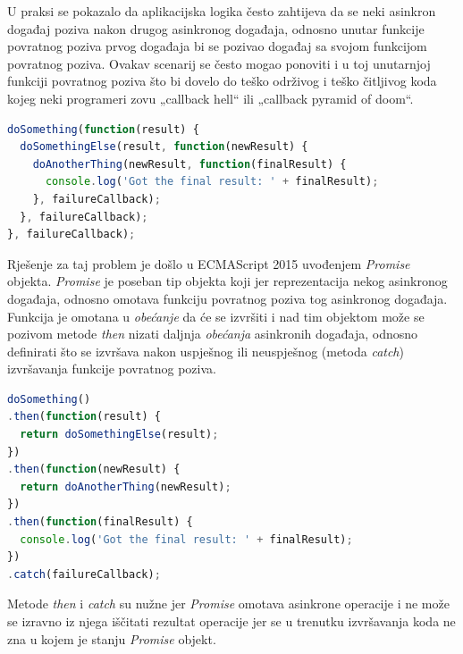 \documentclass[times, utf8, diplomski, numeric]{fer}
\newcommand{\razmakp}{\vspace{18pt}}
\newcommand{\razmaks}{\vspace{10pt}}
\begin{document}
\razmakp

U praksi se pokazalo da aplikacijska logika često zahtijeva da se neki asinkron događaj poziva nakon drugog asinkronog događaja, odnosno unutar funkcije povratnog poziva prvog događaja bi se pozivao događaj sa svojom funkcijom povratnog poziva.
Ovakav scenarij se često mogao ponoviti i u toj unutarnjoj funkciji povratnog poziva što bi dovelo do teško održivog i teško čitljivog koda kojeg neki programeri zovu „callback hell“ ili „callback pyramid of doom“.

\razmakp %
\begin{lstlisting}[language=JavaScript, caption={Primjer ugnježđivanja funkcija povratnog poziva}, label={lst:callback}]
doSomething(function(result) {
  doSomethingElse(result, function(newResult) {
    doAnotherThing(newResult, function(finalResult) {
      console.log('Got the final result: ' + finalResult);
    }, failureCallback);
  }, failureCallback);
}, failureCallback);
\end{lstlisting}
\razmaks

Rješenje za taj problem je došlo u ECMAScript 2015 uvođenjem \emph{Promise} objekta.
\emph{Promise} je poseban tip objekta koji jer reprezentacija nekog asinkronog događaja, odnosno omotava funkciju povratnog poziva tog asinkronog događaja.
Funkcija je omotana u \emph{obećanje} da će se izvršiti i nad tim objektom može se pozivom metode \emph{then} nizati daljnja \emph{obećanja} asinkronih događaja, odnosno definirati što se izvršava nakon uspješnog ili neuspješnog (metoda \emph{catch}) izvršavanja funkcije povratnog poziva.

\razmakp %
\begin{lstlisting}[language=JavaScript, caption={Primjer korištenja \emph{Promise} objekta}, label={lst:promise}]
doSomething()
.then(function(result) {
  return doSomethingElse(result);
})
.then(function(newResult) {
  return doAnotherThing(newResult);
})
.then(function(finalResult) {
  console.log('Got the final result: ' + finalResult);
})
.catch(failureCallback);
\end{lstlisting}
\razmaks

Metode \emph{then} i \emph{catch} su nužne jer \emph{Promise} omotava asinkrone operacije i ne može se izravno iz njega iščitati rezultat operacije jer se u trenutku izvršavanja koda ne zna u kojem je stanju \emph{Promise} objekt.
\end{document}
